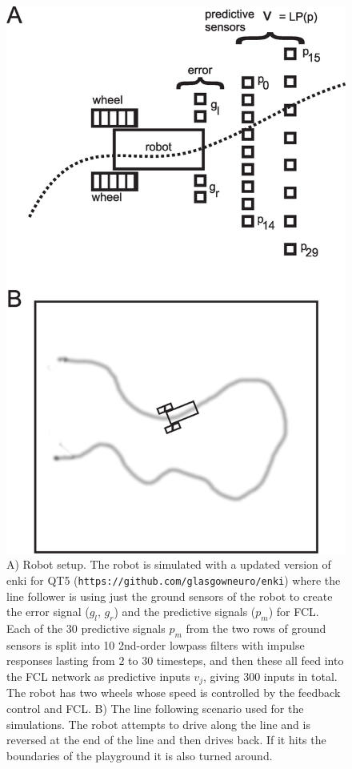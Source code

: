 \documentclass[Afour,sageh,times]{sagej}
\begin{document}
\begin{figure}[!ht]
  \centering
  \includegraphics[width=0.85\columnwidth]{linefollower_robot_playground}
  \caption{A) Robot setup. The robot is simulated with a updated
    version of enki for QT5 (\texttt{https://github.com/glasgowneuro/enki})
    where the line follower is using just the ground sensors of the
    robot to create the error signal ($g_l$, $g_r$) and the predictive signals ($p_m$)
    for FCL. Each of the 30 predictive signals $p_m$ from the two rows of ground sensors
    is split into 10 2nd-order lowpass filters with impulse responses
    lasting from $2$ to $30$ timesteps, and then these all feed into the FCL
    network as predictive inputs $v_j$, giving 300 inputs in total.
    The robot has two wheels whose speed is controlled
    by the feedback control and FCL.
    B) The line following scenario used for the simulations. The robot
    attempts to drive along the line and is reversed at the end of the
    line and then drives back. If it hits the boundaries of the playground
    it is also turned around.
    \label{linefollower_robot_playground}}
\end{figure}
\end{document}
